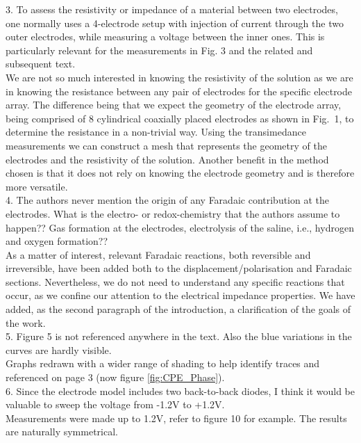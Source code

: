 \documentclass[journal, a4paper]{IEEEtran}
\begin{document}
{3. To assess the resistivity or impedance of a material between two electrodes, one normally uses a 4-electrode setup with injection of current through the two outer electrodes, while measuring a voltage between the inner ones. This is particularly relevant for the measurements in Fig. 3 and the related and subsequent text.\\
{\color{OliveGreen}
    We are not so much interested in knowing the resistivity of the solution as we are in knowing the resistance between any pair of electrodes for the specific electrode array. The difference being that we expect the geometry of the electrode array, being comprised of 8 cylindrical coaxially placed electrodes as shown in Fig.~1, to determine the resistance in a non-trivial way. Using the transimedance measurements we can construct a mesh that represents the geometry of the electrodes and the resistivity of the solution. Another benefit in the method chosen is that it does not rely on knowing the electrode geometry and is therefore more versatile.
}\\

4. The authors never mention the origin of any Faradaic contribution at the electrodes. What is the electro- or redox-chemistry that the authors assume to happen?? Gas formation at the electrodes, electrolysis of the saline, i.e., hydrogen and oxygen formation??\\
{\color{OliveGreen}
    As a matter of interest, relevant Faradaic reactions, both reversible and irreversible, have been added both to the displacement/polarisation and Faradaic sections. Nevertheless, we do not need to understand any specific reactions that occur, as we confine our attention to the electrical impedance properties. We have added, as the second paragraph of the introduction, a clarification of the goals of the work.
}\\

5. Figure 5 is not referenced anywhere in the text. Also the blue variations in the curves are hardly visible.\\
{\color{OliveGreen}
    Graphs redrawn with a wider range of shading to help identify traces and referenced on page 3 (now figure \ref{fig:CPE_Phase}).
}\\

6. Since the electrode model includes two back-to-back diodes, I think it would be valuable to sweep the voltage from -1.2V to +1.2V.\\
{\color{OliveGreen}
Measurements were made up to 1.2V, refer to figure 10 for example. The results are naturally symmetrical.
}\\

}
\end{document}
